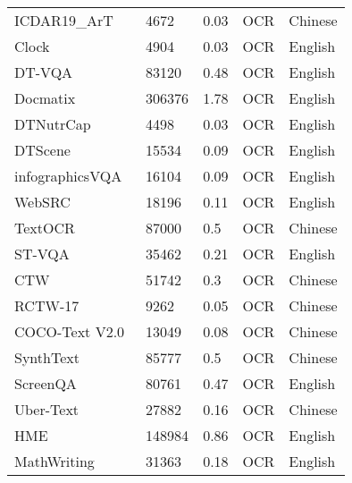 \begin{table}[h]
\begin{tabular}{l|l|l|l|l}
ICDAR19\_ArT~\cite{chng2019icdar2019}         & 4672   & 0.03       & OCR          & Chinese         \\
Clock~\cite{yang2022s}                             & 4904   & 0.03       & OCR          & English         \\
DT-VQA~\cite{zhang2024exploring}                   & 83120  & 0.48       & OCR          & English         \\
Docmatix~\cite{2024docmatrix}              & 306376 & 1.78       & OCR          & English         \\
DTNutrCap~\cite{zhang2024exploring}                & 4498   & 0.03       & OCR          & English         \\
DTScene~\cite{zhang2024exploring}                  & 15534  & 0.09       & OCR          & English         \\
infographicsVQA~\cite{mathew2021infographicvqa}    & 16104  & 0.09       & OCR          & English         \\
WebSRC~\cite{chen-etal-2021-websrc}                & 18196  & 0.11       & OCR          & English         \\
TextOCR~\cite{singh2021textocr}                    & 87000  & 0.5        & OCR          & Chinese         \\
ST-VQA~\cite{biten2019scene}                       & 35462  & 0.21       & OCR          & English         \\
CTW~\cite{yuan2019ctw}                             & 51742  & 0.3        & OCR          & Chinese         \\
RCTW-17~\cite{shi2017icdar2017}                    & 9262   & 0.05       & OCR          & Chinese         \\
COCO-Text   V2.0~\cite{veit2016cocotext}           & 13049  & 0.08       & OCR          & Chinese         \\
SynthText~\cite{Gupta16}                           & 85777  & 0.5        & OCR          & Chinese         \\
ScreenQA~\cite{baechler2024screenai}               & 80761  & 0.47       & OCR          & English         \\
Uber-Text~\cite{UberText}                          & 27882  & 0.16       & OCR          & Chinese         \\
HME~\cite{yuan2022syntax}                          & 148984 & 0.86       & OCR          & English         \\
MathWriting~\cite{gervais2024mathwriting}          & 31363  & 0.18       & OCR          & English         \\

\end{tabular}
\end{table}
